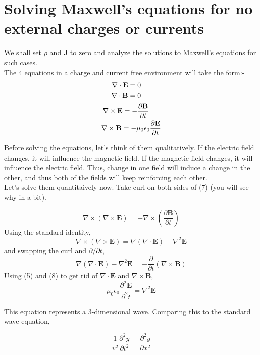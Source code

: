 \documentclass[12pt]{article}
\begin{document}
\section{Solving Maxwell's equations for no external charges or currents}
We shall set $\rho$ and $\mathbf{J}$ to zero and analyze the solutions to Maxwell's equations for such cases. \\
The 4 equations in a charge and current free environment will take the form:- 
\begin{align}
\nabla\cdot\mathbf{E}=0\hspace{1cm}\\
\nabla\cdot\mathbf{B}=0\hspace{1cm}\\
\nabla\times\mathbf{E}=-\frac{\partial \mathbf{B}}{\partial t}\hspace{0.6cm}\\
\nabla\times\mathbf{B}=-\mu_0\epsilon_0\frac{\partial \mathbf{E}}{\partial t}
\end{align}


Before solving the equations, let's think of them qualitatively. If the electric field changes, it will influence the magnetic field. 
If the magnetic field changes, it will influence the electric field. Thus, change in one field will induce a change in the other, and thus both of the fields will 
keep reinforcing each other. \\
Let's solve them quantitaively now. Take curl on both sides of (7) (you will see why in a bit).

\[\nabla\times(\nabla\times\mathbf{E})=-\nabla\times\left(\frac{\partial \mathbf{B}}{\partial t}\right)\]
Using the standard identity, 
\[\nabla\times(\nabla\times\mathbf{E}) = \nabla(\nabla\cdot\mathbf{E})-\nabla^2\mathbf{E}\]
and swapping the curl and $\partial/\partial t$,
\[\nabla(\nabla\cdot\mathbf{E})-\nabla^2\mathbf{E}=-\frac{\partial}{\partial t}(\nabla\times\mathbf{B})\]
Using (5) and (8) to get rid of $\nabla\cdot\mathbf{E}$ and $\nabla\times\mathbf{B}$,\\

\begin{equation}\mu_0\epsilon_0\frac{\partial^2\mathbf{E}}{\partial^2 t}=\nabla^2\mathbf{E}\end{equation}

This equation represents a 3-dimensional wave. Comparing this to the standard wave equation, 

\[\frac{1}{v^2}\frac{\partial^2 y}{\partial t^2}=\frac{\partial^2 y}{\partial x^2}\]
\end{document}
